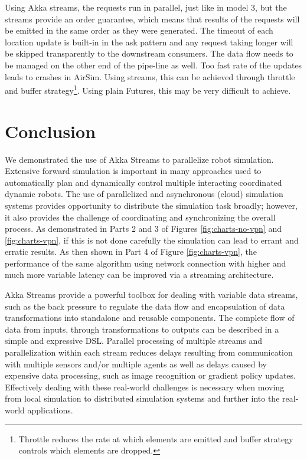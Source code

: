 \documentclass{article}
\begin{document}
Using Akka streams, the requests run in parallel, just like in model 3, but the streams provide an order guarantee, which means that results of the requests will be emitted in the same order as they were generated. The timeout of each location update is built-in in the ask pattern and any request taking longer will be skipped transparently to the downstream consumers. The data flow needs to be managed on the other end of the pipe-line as well. Too fast rate of the updates leads to crashes in AirSim. Using streams, this can be achieved through throttle and buffer strategy\footnote{Throttle reduces the rate at which elements are emitted and buffer strategy controls which elements are dropped.}. Using plain Futures, this may be very difficult to achieve.




\section{Conclusion}
We demonstrated the use of Akka Streams to parallelize robot simulation. Extensive forward simulation is important in many approaches used to automatically plan and dynamically control multiple interacting coordinated dynamic robots. The use of parallelized and asynchronous (cloud) simulation systems provides opportunity to distribute the simulation task broadly; however, it also provides the challenge of coordinating and synchronizing the overall process. 
As demonstrated in Parts 2 and 3 of Figures \ref{fig:charts-no-vpn} and  \ref{fig:charts-vpn}, if this is not done carefully the simulation can lead to errant and erratic results. As then shown in Part 4 of Figure \ref{fig:charts-vpn}, the performance of the same algorithm using network connection with higher and much more variable latency can be improved via a streaming architecture.

Akka Streams provide a powerful toolbox for dealing with variable data streams, such as the back pressure to regulate the data flow and encapsulation of data transformations into standalone and reusable components. The complete flow of data from inputs, through transformations to outputs can be described in a simple and expressive DSL. Parallel processing of multiple streams and parallelization within each stream reduces delays resulting from communication with multiple sensors and/or multiple agents as well as delays caused by expensive data processing, such as image recognition or gradient policy updates. 
Effectively dealing with these real-world challenges is necessary when moving from local simulation to distributed simulation systems and further into the real-world applications.
\end{document}

